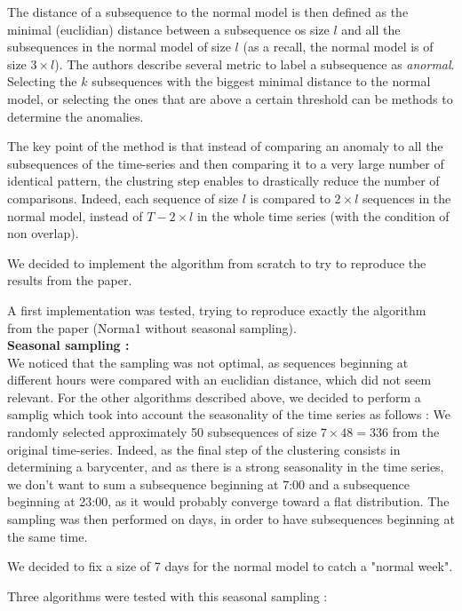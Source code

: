 \documentclass[11pt]{article}
\begin{document}
The distance of a subsequence to the normal model is then defined as the minimal (euclidian) distance between a subsequence os size $l$ and all the subsequences in the normal model of size $l$ (as a recall, the normal model is of size $3 \times l$).
The authors describe several metric to label a subsequence as \textit{anormal}. 
Selecting the $k$ subsequences with the biggest minimal distance to the normal model, or selecting the ones that are above a certain threshold can be methods to determine the anomalies.

The key point of the method is that instead of comparing an anomaly to all the subsequences of the time-series and then comparing it to a very large number of identical pattern, the clustring step enables to drastically reduce the number of comparisons. 
Indeed, each sequence of size $l$ is compared to $2 \times l $ sequences in the normal model, instead of $T - 2 \times l$ in the whole time series (with the condition of non overlap). 


We decided to implement the algorithm from scratch to try to reproduce the results from the paper. 

A first implementation was tested, trying to reproduce exactly the algorithm from the paper (Norma1 without seasonal sampling). \\[0.5cm]

\textbf{Seasonal sampling : }\\
We noticed that the sampling was not optimal, as sequences beginning at different hours were compared with an euclidian distance, which did not seem relevant.
For the other algorithms described above, we decided to perform a samplig which took into account the seasonality of the time series as follows : 
We randomly selected approximately 50 subsequences of size $ 7 \times 48 = 336$ from the original time-series. 
Indeed, as the final step of the clustering consists in determining a barycenter, and as there is a strong seasonality in the time series, we don't want to sum a subsequence beginning at 7:00 and a subsequence beginning at 23:00, as it would probably converge toward a flat distribution. 
The sampling was then performed on days, in order to have subsequences beginning at the same time. 

We decided to fix a size of 7 days for the normal model to catch a "normal week". 

Three algorithms were tested with this seasonal sampling :
\end{document}

